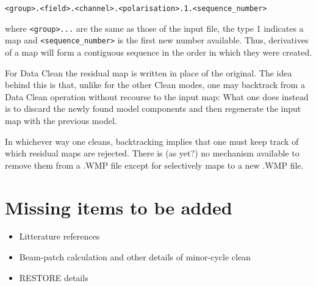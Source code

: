 	\verb/<group>.<field>.<channel>.<polarisation>.1.<sequence_number>/

where \verb/<group>.../  are the same as those of the input file, the type 1
indicates a map and \verb/<sequence_number>/ is the first new number available.
Thus, derivatives of a map will form a contiguous sequence in the order in
which they were created.

	For Data Clean the residual map is written in place of the original.
The idea behind this is that, unlike for the other Clean modes, one may
backtrack from a Data Clean operation without recourse to the input map: What
one does instead is to discard the newly found model components and then
regenerate the input map with the previous model.

	In whichever way one cleans, backtracking implies that one must keep
track of which residual maps are rejected. There is (as yet?) no mechanism
available to remove them from a .WMP file except for selectively
 maps to a new .WMP file.



\section{Missing items to be added}
\label{.missing}

\begin{itemize}
\item   Litterature references
\item   Beam-patch calculation and other details of minor-cycle clean
\item   RESTORE details
\end{itemize}



